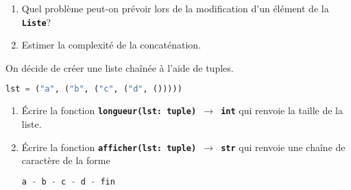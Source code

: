 \documentclass[a4paper,11pt]{article}
\begin{document}
\begin{exo}
\begin{enumerate}
\begin{center}
                  \label{concat}
              \end{center}
        \item Quel problème peut-on prévoir lors de la modification d'un élément de la \textbf{\texttt{Liste}}?
        \item Estimer la complexité de la concaténation.
    \end{enumerate}
\end{exo}
\begin{exo}
    On décide de créer une liste chaînée à l'aide de tuples.
    \begin{center}
        \begin{lstlisting}[language=Python  , xleftmargin=2em, xrightmargin=2em]
lst = ("a", ("b", ("c", ("d", ()))))
\end{lstlisting}
        \label{CODE}
    \end{center}
    \begin{enumerate}
        \item Écrire la fonction \textbf{\texttt{longueur(lst: tuple) $\rightarrow$ int}} qui renvoie la taille de la liste.
        \item Écrire la fonction \textbf{\texttt{afficher(lst: tuple) $\rightarrow$ str}} qui renvoie une chaîne de caractère de la forme
              \begin{lstlisting}[language=Python  , xleftmargin=2em, xrightmargin=2em]
a - b - c - d - fin
\end{lstlisting}
    \end{enumerate}
\end{exo}
\end{document}
